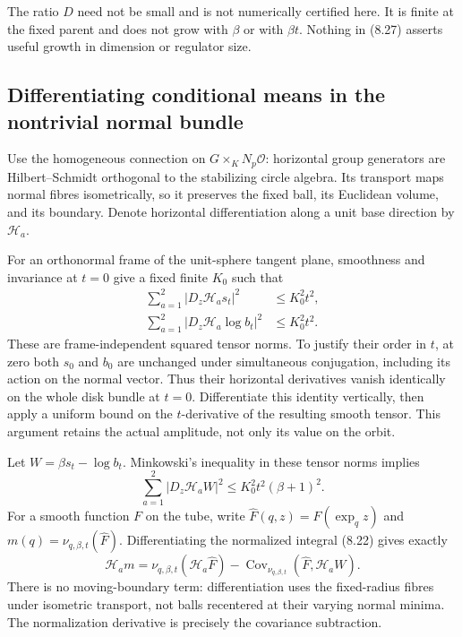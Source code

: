 \documentclass[11pt,oneside]{article}
\newcommand{\cO}{\mathcal O}
\begin{document}
The ratio \(D\) need not be
small and is not numerically
certified here. It is finite
at the fixed parent and does
not grow with \(\beta\) or
with \(\beta t\). Nothing in
(8.27) asserts useful growth
in dimension or regulator size.

\subsection{Differentiating conditional means in the nontrivial normal bundle}

Use the homogeneous connection
on \(G\times_K N_p\cO\):
horizontal group generators
are Hilbert--Schmidt orthogonal
to the stabilizing circle
algebra. Its transport maps
normal fibres isometrically,
so it preserves the fixed
ball, its Euclidean volume,
and its boundary. Denote
horizontal differentiation
along a unit base direction
by \(\mathcal H_a\).

For an orthonormal frame of
the unit-sphere tangent plane,
smoothness and invariance
at \(t=0\) give a fixed
finite \(K_0\) such that
\[
 \begin{split}
 \sum_{a=1}^2|D_z\mathcal H_as_t|^2
                                  &\le K_0^2t^2,\\
 \sum_{a=1}^2|D_z\mathcal H_a\log b_t|^2
                                  &\le K_0^2t^2 .
 \end{split}
 \tag{8.29}
\]
These are frame-independent
squared tensor norms.
To justify their order in
\(t\), at zero both \(s_0\)
and \(b_0\) are unchanged
under simultaneous conjugation,
including its action on
the normal vector. Thus
their horizontal derivatives
vanish identically on the
whole disk bundle at \(t=0\).
Differentiate this identity
vertically, then apply a
uniform bound on the
\(t\)-derivative of the
resulting smooth tensor.
This argument retains the
actual amplitude, not only
its value on the orbit.

Let \(W=\beta s_t-\log b_t\).
Minkowski's inequality in
these tensor norms implies
\[
       \sum_{a=1}^2|D_z\mathcal H_aW|^2
                         \le K_0^2t^2(\beta+1)^2.
 \tag{8.30}
\]
For a smooth function \(F\)
on the tube, write
\(\widehat F(q,z)=F(\exp_qz)\)
and \(m(q)=\nu_{q,\beta,t}(\widehat F)\).
Differentiating the normalized
integral (8.22) gives exactly
\[
 \mathcal H_am
   =\nu_{q,\beta,t}(\mathcal H_a\widehat F)
       -\operatorname{Cov}_{\nu_{q,\beta,t}}
                         (\widehat F,\mathcal H_aW).
 \tag{8.31}
\]
There is no moving-boundary
term: differentiation uses
the fixed-radius fibres
under isometric transport,
not balls recentered at
their varying normal minima.
The normalization derivative
is precisely the covariance
subtraction.
\end{document}
